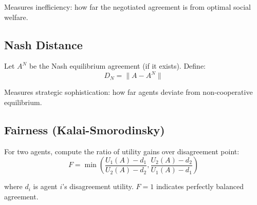 \documentclass[11pt]{article}
\begin{document}
Measures inefficiency: how far the negotiated agreement is from optimal social welfare.

\subsection{Nash Distance}
Let $A^N$ be the Nash equilibrium agreement (if it exists). Define:
\begin{equation}
D_N = \|A - A^N\|
\end{equation}

Measures strategic sophistication: how far agents deviate from non-cooperative equilibrium.

\subsection{Fairness (Kalai-Smorodinsky)}
For two agents, compute the ratio of utility gains over disagreement point:
\begin{equation}
F = \min\left(\frac{U_1(A) - d_1}{U_2(A) - d_2}, \frac{U_2(A) - d_2}{U_1(A) - d_1}\right)
\end{equation}

where $d_i$ is agent $i$'s disagreement utility. $F = 1$ indicates perfectly balanced agreement.
\end{document}
